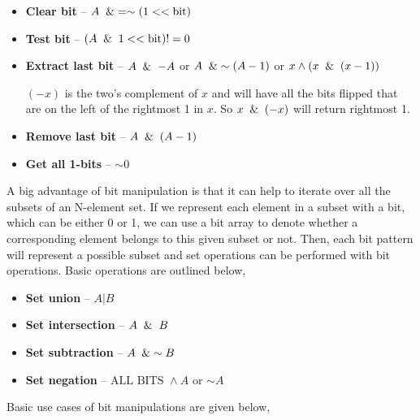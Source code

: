 \documentclass{article}
\begin{document}
\begin{itemize}
        \item \textbf{Clear bit} -- $A \And = \sim (1 << \text{bit})$
        \item \textbf{Test bit} -- $(A \And 1 << \text{bit}) != 0$
        \item \textbf{Extract last bit} -- $A\And-A$ or $A \And \sim (A-1)$ or $x\wedge (x \And (x -1))$
        
        $(-x)$ is the two’s complement of $x$ and will have all the bits flipped that are on the left of the rightmost 1 in $x$. So $x \And (-x)$ will return rightmost 1.
        
        \item \textbf{Remove last bit} -- $A \And (A-1)$
        \item \textbf{Get all 1-bits} -- $\sim 0$
        
    \end{itemize}
    
    A big advantage of bit manipulation is that it can help to iterate over all the subsets of an N-element set. If we represent each element in a subset with a bit, which can be either 0 or 1, we can use a bit array to denote whether a corresponding element belongs to this given subset or not. Then, each bit pattern will represent a possible subset and set operations can be performed with bit operations. Basic operations are outlined below,
    
    \begin{itemize}
        \item \textbf{Set union} -- $A \vert B$
        \item \textbf{Set intersection} -- $A \And B$
        \item \textbf{Set subtraction} -- $A \And \sim B$
        \item \textbf{Set negation} -- $\text{ALL BITS } \wedge A$ or $\sim A$
    \end{itemize}
    
    Basic use cases of bit manipulations are given below,
    
\end{document}
